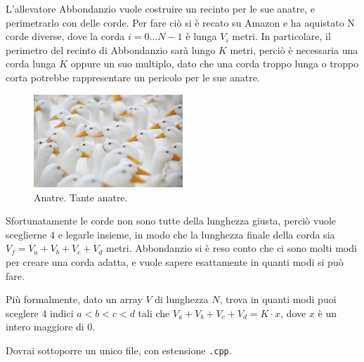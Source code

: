 \usepackage{xcolor}
\usepackage{afterpage}
\usepackage{pifont,mdframed}
\usepackage[bottom]{footmisc}
\usepackage{minted}

\newcommand{\inputfile}{\texttt{stdin}}
\newcommand{\outputfile}{\texttt{stdout}}
\makeatletter
\renewcommand{\this@inputfilename}{\texttt{stdin}}
\renewcommand{\this@outputfilename}{\texttt{stdout}}
\renewcommand{\this@syllabuslevel}{5}
\renewcommand{\this@custdifficulty}{3}
\makeatother
{}

L'allevatore Abbondanzio vuole costruire un recinto per le sue anatre, e perimetrarlo con delle corde.
Per fare ciò si è recato su Amazon e ha aquistato N corde diverse, dove la corda $i = 0 \dots N-1$ è lunga $V_i$ metri.
In particolare, il perimetro del recinto di Abbondanzio sarà lungo $K$ metri, perciò è necessaria una corda lunga $K$
oppure un suo multiplo, dato che una corda troppo lunga o troppo corta potrebbe rappresentare un pericolo per le sue anatre.

\begin{figure}[h]
    \centering
    \includegraphics[width=0.5\textwidth]{duck.jpg}
    \caption{Anatre. Tante anatre.}
\end{figure}

Sfortunatamente le corde non sono tutte della lunghezza giusta, perciò vuole sceglierne $4$ e legarle insieme,
in modo che la lunghezza finale della corda sia $V_f = V_a + V_b + V_c + V_d$ metri.
Abbondanzio si è reso conto che ci sono molti modi per creare una corda adatta, e vuole sapere esattamente in quanti modi si può fare.

Più formalmente, dato un array $V$ di lunghezza $N$, trova in quanti modi puoi sceglere $4$ indici $a < b < c < d$ tali che
$V_a + V_b + V_c + V_d = K \cdot x$, dove $x$ è un intero maggiore di 0.


\Implementation

Dovrai sottoporre un unico file, con estensione \texttt{.cpp}.

